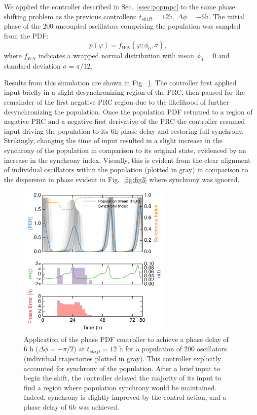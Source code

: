     We applied the controller described in Sec.~\ref{ssec:popmpc} to the same phase shifting problem as the previous controllers: $t_{shift}=12$h, $\Delta\phi = -6$h.
The initial phase of the 200 uncoupled oscillators comprising the population was sampled from the PDF:
\begin{equation}
    p(\varphi) = f_{WN}(\varphi; \phi_0, \sigma),
\end{equation}
where $f_{WN}$ indicates a wrapped normal distribution with mean $\phi_0 = 0$ and standard deviation $\sigma=\pi/12$.

Results from this simulation are shown in Fig.~\ref{fig:fig4}.
The controller first applied input briefly in a slight desynchronizing region of the PRC, then paused for the remainder of the first negative PRC region due to the likelihood of further desynchronizing the population.
Once the population PDF returned to a region of negative PRC and a negative first derivative of the PRC the controller resumed input driving the population to its $6$h phase delay and restoring full synchrony.
Strikingly, changing the time of input resulted in a slight increase in the synchrony of the population in comparison to its original state, evidenced by an increase in the synchrony index.
Visually, this is evident from the clear alignment of individual oscillators within the population (plotted in gray) in comparison to the dispersion in phase evident in Fig.~\ref{fig:fig3} where synchrony was ignored.


\begin{figure}[p]
    \begin{center}
\includegraphics[width=7.5cm]{chap7/figures/fig4_population.png}
\end{center}
\caption{Application of the phase PDF controller to achieve a phase delay of $6$ h ($\Delta\phi = -\pi/2$) at $t_{shift} = 12$ h for a population of 200 oscillators (individual trajectories plotted in gray). This controller explicitly accounted for synchrony of the population. After a brief input to begin the shift, the controller delayed the majority of its input to find a region where population synchrony would be maintained. Indeed, synchrony is slightly improved by the control action, and a phase delay of $6h$ was achieved.}
\label{fig:fig4}       %
\end{figure}


